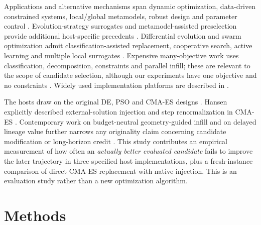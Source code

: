 \documentclass[11pt,a4paper]{article}
\begin{document}
Applications and alternative mechanisms span dynamic optimization, data-driven constrained systems, local/global metamodels, robust design and parameter control \cite{luo2019,wang2020forest,zhou2007,ong2006,bagheri2017}. Evolution-strategy surrogates and metamodel-assisted preselection provide additional host-specific precedents \cite{emmerich2002,hansen2019surrogate}. Differential evolution and swarm optimization admit classification-assisted replacement, cooperative search, active learning and multiple local surrogates \cite{lu2011,wang2019de,sun2017pso,lv2019,wang2017committee,li2021}. Expensive many-objective work uses classification, decomposition, constraints and parallel infill; these are relevant to the scope of candidate selection, although our experiments have one objective and no constraints \cite{habib2019,pan2019,deb2019taxonomy,viana2010,beaucaire2019,berveglieri2020,bagheri2017constraint}. Widely used implementation platforms are described in \cite{blank2020pymoo,tian2017}.

The hosts draw on the original DE, PSO and CMA-ES designs \cite{storn1997,kennedy1995,hansen2001}. Hansen explicitly described external-solution injection and step renormalization in CMA-ES \cite{hansen2011inject}. Contemporary work on budget-neutral geometry-guided infill and on delayed lineage value further narrows any originality claim concerning candidate modification or long-horizon credit \cite{yu2026janus,siper2026}. This study contributes an empirical measurement of how often an \emph{actually better evaluated candidate} fails to improve the later trajectory in three specified host implementations, plus a fresh-instance comparison of direct CMA-ES replacement with native injection. This is an evaluation study rather than a new optimization algorithm.

\section{Methods}
\end{document}
